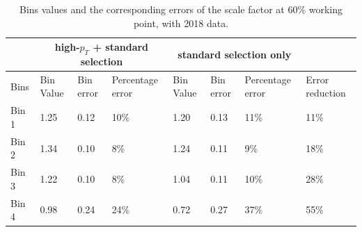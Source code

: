  \begin{table}[ht]
 \begin{centering}
 \begin{tabular}{|p{2.5em}||p{2.5em}|p{2.5em}|p{5em}||p{2.5em}|p{2.5em}|p{5em}||p{5em}|}
          \hline
          & \multicolumn{3}{|c||}{high-$p_{T}$ + standard selection} & \multicolumn{3}{|c||}{standard selection only} & \\  \hline\hline
          Bins& Bin Value &Bin error&Percentage error&Bin Value &Bin error&Percentage error & Error reduction\\ \hline
          Bin 1 & 1.25 & 0.12 & 10\% &1.20 & 0.13 & 11\% & 11\% \\ \hline
          Bin 2 & 1.34 & 0.10 & 8\% & 1.24 & 0.11 & 9\% & 18\% \\ \hline
          Bin 3 & 1.22 & 0.10 & 8\% & 1.04 & 0.11 & 10\% & 28\% \\ \hline
          Bin 4 & 0.98 & 0.24 & 24\% & 0.72 & 0.27 & 37\% & 55\% \\ \hline
          
 
 \end{tabular} 
 \caption{Bins values and the corresponding errors of the scale factor at 60\% working point, with 2018 data.}
 \end{centering}
 \label{tab:limit}
 \end{table}

\fi

\newpage